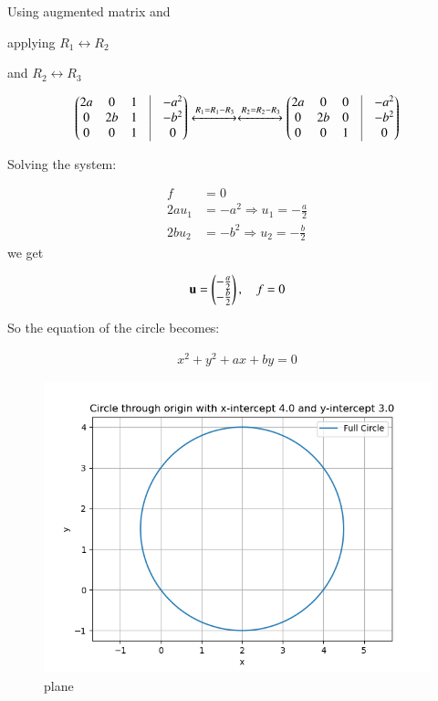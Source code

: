 \documentclass[journal]{IEEEtran}
\begin{document}
Using augmented matrix and

applying $R_1\leftrightarrow R_2$

and $R_2\leftrightarrow R_3$

\begin{align}
\myvec{
2a & 0 & 1 &\vrule &-a^2 \\ 
0 & 2b & 1 &\vrule &-b^2\\
0 & 0 & 1 &\vrule &0 
} \xleftrightarrow{R_1=R_1 - R_3}\xleftrightarrow{R_2=R_2 - R_3}
\myvec{
2a & 0 & 0 &\vrule &-a^2 \\ 
0 & 2b & 0 &\vrule &-b^2\\
0 & 0 & 1 &\vrule &0 
}
\end{align}

Solving the system:

\begin{align*}
f &= 0 \\
2a u_1 &= -a^2 \Rightarrow u_1 = -\frac{a}{2} \\
2b u_2 &= -b^2 \Rightarrow u_2 = -\frac{b}{2}
\end{align*}
\newpage
we get

\begin{align}
\mathbf{u} = \begin{pmatrix} -\frac{a}{2} \\ -\frac{b}{2} \end{pmatrix}, \quad f = 0
\end{align}

So the equation of the circle becomes:

\begin{align}
x^2 + y^2 + ax + by = 0
\end{align}

\begin{figure}[H]
\centering
\includegraphics[width=0.7\columnwidth]{figs/fig.png} 
\caption{plane}
\label{}
\end{figure}
\end{document}
